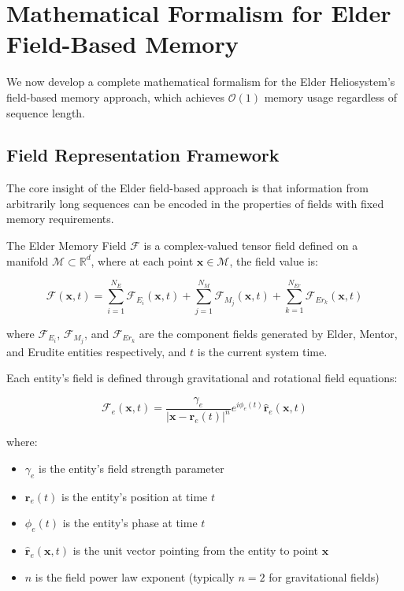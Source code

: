 \section{Mathematical Formalism for Elder Field-Based Memory}

We now develop a complete mathematical formalism for the Elder Heliosystem's field-based memory approach, which achieves $\mathcal{O}(1)$ memory usage regardless of sequence length.

\subsection{Field Representation Framework}

The core insight of the Elder field-based approach is that information from arbitrarily long sequences can be encoded in the properties of fields with fixed memory requirements.

\begin{definition}
The Elder Memory Field $\mathcal{F}$ is a complex-valued tensor field defined on a manifold $\mathcal{M} \subset \mathbb{R}^d$, where at each point $\mathbf{x} \in \mathcal{M}$, the field value is:

\begin{equation}
\mathcal{F}(\mathbf{x}, t) = \sum_{i=1}^{N_E} \mathcal{F}_{E_i}(\mathbf{x}, t) + \sum_{j=1}^{N_M} \mathcal{F}_{M_j}(\mathbf{x}, t) + \sum_{k=1}^{N_{Er}} \mathcal{F}_{Er_k}(\mathbf{x}, t)
\end{equation}

where $\mathcal{F}_{E_i}$, $\mathcal{F}_{M_j}$, and $\mathcal{F}_{Er_k}$ are the component fields generated by Elder, Mentor, and Erudite entities respectively, and $t$ is the current system time.
\end{definition}

Each entity's field is defined through gravitational and rotational field equations:

\begin{equation}
\mathcal{F}_e(\mathbf{x}, t) = \frac{\gamma_e}{|\mathbf{x} - \mathbf{r}_e(t)|^n} e^{i\phi_e(t)} \hat{\mathbf{r}}_{e}(\mathbf{x}, t)
\end{equation}

where:
\begin{itemize}
    \item $\gamma_e$ is the entity's field strength parameter
    \item $\mathbf{r}_e(t)$ is the entity's position at time $t$
    \item $\phi_e(t)$ is the entity's phase at time $t$
    \item $\hat{\mathbf{r}}_{e}(\mathbf{x}, t)$ is the unit vector pointing from the entity to point $\mathbf{x}$
    \item $n$ is the field power law exponent (typically $n=2$ for gravitational fields)
\end{itemize}

